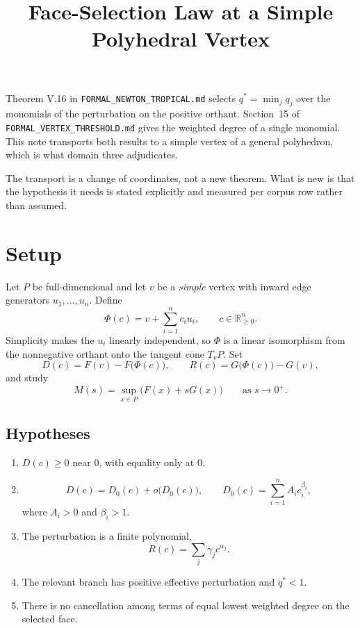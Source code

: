 \documentclass[11pt]{article}
\title{Face-Selection Law at a Simple Polyhedral Vertex}
\author{}
\date{}
\theoremstyle{definition}
\theoremstyle{remark}
\begin{document}
\maketitle

Theorem V.16 in \texttt{FORMAL\_NEWTON\_TROPICAL.md} selects
$q^*=\min_j q_j$ over the monomials of the perturbation on the positive
orthant.  Section~15 of \texttt{FORMAL\_VERTEX\_THRESHOLD.md} gives the
weighted degree of a single monomial.  This note transports both results to a
simple vertex of a general polyhedron, which is what domain three adjudicates.

The transport is a change of coordinates, not a new theorem.  What is new is
that the hypothesis it needs is stated explicitly and measured per corpus row
rather than assumed.

\section{Setup}

Let $P$ be full-dimensional and let $v$ be a \emph{simple} vertex with inward
edge generators $u_1,\dots,u_n$.  Define
\[
  \Phi(c)=v+\sum_{i=1}^n c_i u_i,
  \qquad c\in\mathbb{R}_{\geq 0}^n.
\]
Simplicity makes the $u_i$ linearly independent, so $\Phi$ is a linear
isomorphism from the nonnegative orthant onto the tangent cone $T_vP$.  Set
\[
  D(c)=F(v)-F\bigl(\Phi(c)\bigr),
  \qquad
  R(c)=G\bigl(\Phi(c)\bigr)-G(v),
\]
and study
\[
  M(s)=\sup_{x\in P}\bigl(F(x)+sG(x)\bigr)
  \qquad\text{as }s\to0^+.
\]

\subsection{Hypotheses}

\begin{enumerate}[label=\arabic*.]
  \item $D(c)\geq0$ near $0$, with equality only at $0$.

  \item
  \[
    D(c)=D_0(c)+o\bigl(D_0(c)\bigr),
    \qquad
    D_0(c)=\sum_{i=1}^n A_i c_i^{\beta_i},
  \]
  where $A_i>0$ and $\beta_i>1$.

  \item The perturbation is a finite polynomial,
  \[
    R(c)=\sum_j\gamma_j c^{\alpha_j}.
  \]

  \item The relevant branch has positive effective perturbation and $q^*<1$.

  \item There is no cancellation among terms of equal lowest weighted degree
  on the selected face.
\end{enumerate}
\end{document}
